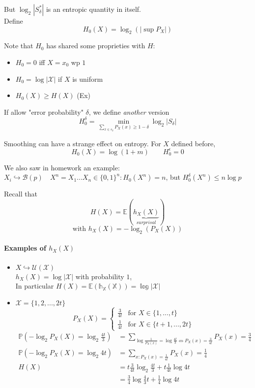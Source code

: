 But $\log_2 |S_\delta^* |$ is an entropic quantity in itself.\\
Define
\[\tag{Hartley entropy}
H_0(X)=\log_2(|\sup P_X|) \]

Note that $H_0$ has shared some proprieties with $H$:
\begin{itemize}
\item $H_0=0$ iff $X=x_0$ wp $1$
\item $H_0=\log |\mathcal{X}|$ if $X$ is uniform
\item $H_0(X)\geq H(X)$ (Ex)
\end{itemize}

If allow "error probability" $\delta$, we define \emph{another} version
\[H_0^\delta = \min_{\sum_{x\in s_\delta}P_X(x)\geq 1-\delta} \log_2 |S_\delta|\]

Smoothing can have a strange effect on entropy. For $X$ defined before,
\[H_0(X)=\log(1+m) \qquad H_0^\epsilon=0\]

We also saw in homework an example:
$X_i\hookrightarrow \mathcal{B}(p) \quad X^n=X_1...X_n \in \{0,1\}^n: H_0 (X^n)=n$, but $H_0^\delta (X^n)\leq n\log p$

Recall that
\[H(X)=\mathbb{E}(\underbrace{h_X(X)}_{surprisal})\]
\[ \text{with }  h_X(X)=-\log_2(P_X(X))\]

\paragraph{Examples of $h_X(X)$}
\begin{itemize}
\item $X\hookrightarrow \mathcal{U}(\mathcal{X})$\\
$h_X(X)=\log |\mathcal{X}|$ with probability $1$,\\
In particular $H(X)=\mathbb{E(h_X(X))=\log |\mathcal{X}|}$
\item $\mathcal{X}=\{1,2,...,2t\}$
\[
P_X(X)=
\begin{cases}
\frac{3}{4t} & \text{for } X\in\{1,...,t\}\\
\frac{1}{4t} & \text{for } X\in\{t+1,...,2t\}
\end{cases}
\]
\begin{align*}
\mathbb{P}(-\log_2P_X(X)=\log_2 \frac{4t}{3}) &  = \sum_{\log\frac{1}{P_X(x)}=\log\frac{4t}{3} \Leftrightarrow P_X(x)=\frac{3}{4t}} P_X(x)=\frac{3}{4}\\
\mathbb{P}(-\log_2P_X(X)=\log_2 4t) &  = \sum_{x:P_X(x)=\frac{1}{4t}} P_X(x)=\frac{1}{4}\\
H(X) & = t \frac{3}{4t}\log_2 \frac{4t}{3} + t\frac{1}{4t}\log 4t\\
& = \frac{3}{4} \log \frac{4}{3}t + \frac{1}{4}\log 4t
\end{align*}
\end{itemize}

